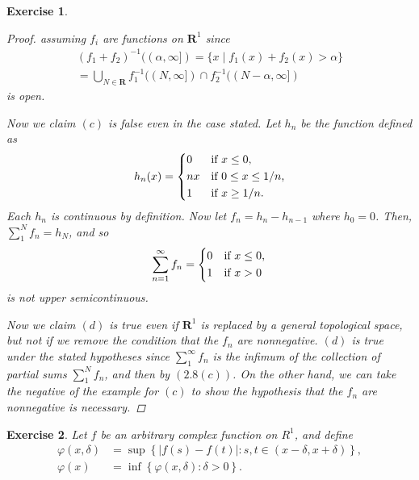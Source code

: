 \documentclass[10pt,letterpaper]{amsart}
\newtheorem{exercise}{Exercise}[section]
\theoremstyle{definition}
\theoremstyle{remark}
\numberwithin{equation}{exercise}
\begin{document}
\begin{multicols}{2}
\begin{exercise}
\begin{proof}
      assuming $f_i$ are functions on $\mathbf{R}^1$ since
      \begin{multline*}
        (f_1+f_2)^{-1}((\alpha,\infty]) = \{x \mid f_1(x) + f_2(x) > \alpha\}\\
        = \bigcup_{N \in \mathbf{R}} f_1^{-1}((N,\infty]) \cap
        f_2^{-1}((N-\alpha,\infty])
      \end{multline*}
      is open.
      \par Now we claim $(c)$ is false even in the case stated. Let $h_n$ be the
      function defined as
      \begin{equation*}
        h_n(x) = \begin{dcases*}
          0 & if $x \le 0$,\\
          nx & if $0 \le x \le 1/n$,\\
          1 & if $x \ge 1/n$.
        \end{dcases*}
      \end{equation*}
      Each $h_n$ is continuous by definition. Now let $f_n = h_{n} -
      h_{n-1}$ where $h_0 = 0$. Then, $\sum_{1}^N f_n = h_N$, and so
      \begin{equation*}
        \sum_{n=1}^\infty f_n = \begin{dcases*}
          0 & if $x \le 0$,\\
          1 & if $x > 0$
        \end{dcases*}
      \end{equation*}
      is not upper semicontinuous.
      \par Now we claim $(d)$ is true even if $\mathbf{R}^1$ is replaced by a
      general topological space, but not if we remove the condition that the
      $f_n$ are nonnegative. $(d)$ is true under the stated hypotheses since
      $\sum_1^\infty f_n$ is the infimum of the collection of partial sums
      $\sum_1^N f_n$, and then by $(2.8(c))$. On the other hand, we can take the
      negative of the example for $(c)$ to show the hypothesis that the $f_n$
      are nonnegative is necessary.
    \end{proof}
  \end{exercise}
  \begin{exercise}
    Let $f$ be an arbitrary complex function on $R^1$, and define
    \begin{align*}
      \varphi(x,\delta) &= \sup\left\{ \lvert f(s) - f(t) \rvert : s,t \in (x -
      \delta, x + \delta) \right\},\\
      \varphi(x) &= \inf\left\{ \varphi(x,\delta) : \delta > 0 \right\}.

\end{align*}
\end{exercise}
\end{multicols}
\end{document}
